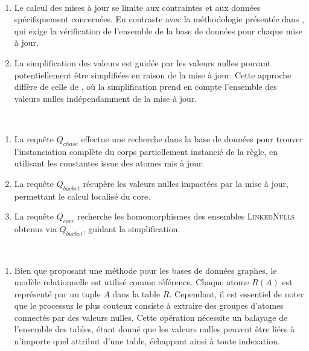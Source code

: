 \begin{description}[wide]
    \item[Incrémentalité] ~
    \begin{enumerate}
        \item Le calcul des mises à jour se limite aux contraintes et aux données spécifiquement concernées.
        En contraste avec la méthodologie présentée dans \cite{chabinConsistentUpdatingDatabases2020}, qui exige la vérification de l'ensemble de la base de données pour chaque mise à jour.
        
        \item La simplification des valeurs est guidée par les valeurs nulles pouvant potentiellement être simplifiées en raison de la mise à jour.
        Cette approche diffère de celle de \cite{chabinConsistentUpdatingDatabases2020}, où la simplification prend en compte l'ensemble des valeurs nulles indépendamment de la mise à jour.
    \end{enumerate}

    \item[Requêtes] ~
    \begin{enumerate}
        \item La requête $Q_{chase}$ effectue une recherche dans la base de données pour trouver l'instanciation complète du corps partiellement instancié de la règle, en utilisant les constantes issue des atomes mis à jour.
        
        \item La requête $Q_{bucket}$ récupère les valeurs nulles impactées par la mise à jour, permettant le calcul localisé du \gls{core}.

        \item La requête $Q_{core}$ recherche les homomorphismes des ensembles \textsc{LinkedNulls} obtenus via $Q_{bucket}$, guidant la simplification.
    \end{enumerate}

    \item[SGBDs] ~
    \begin{enumerate}
        \item Bien que proposant une méthode pour les bases de données graphes, le modèle relationnelle est utilisé comme référence.
        Chaque atome $R(A)$ est représenté par un tuple $A$ dans la table $R$.
        Cependant, il est essentiel de noter que le processus le plus couteux consiste à extraire des groupes d'atomes connectés par des valeurs nulles.
        Cette opération nécessite un balayage de l'ensemble des tables, étant donné que les valeurs nulles peuvent être liées à n'importe quel attribut d'une table, échappant ainsi à toute indexation.
        

\end{enumerate}
\end{description}
